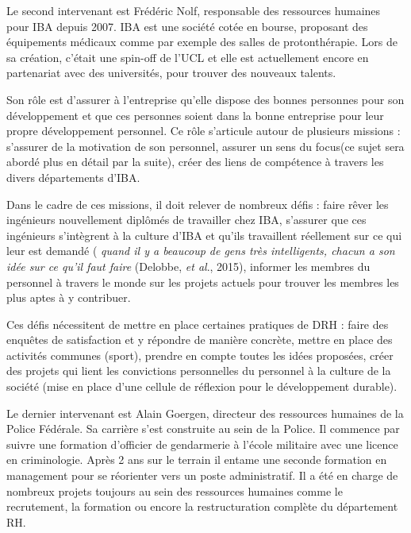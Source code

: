 Le second intervenant est Frédéric Nolf, responsable des ressources humaines pour IBA depuis 2007. IBA est une société cotée en bourse, proposant des équipements médicaux comme par exemple des salles de protonthérapie. Lors de sa création, c'était une spin-off de l'UCL et elle est actuellement encore en partenariat avec des universités, pour trouver des nouveaux talents. \newline

Son rôle est d'assurer à l'entreprise qu'elle dispose des bonnes personnes pour son développement et que ces personnes soient dans la bonne entreprise pour leur propre développement personnel. Ce rôle s'articule autour de plusieurs missions : s'assurer de la motivation de son personnel, assurer un \og{}sens du focus\fg{}(ce sujet sera abordé plus en détail par la suite), créer des liens de compétence à travers les divers départements d'IBA. \newline

Dans le cadre de ces missions, il doit relever de nombreux défis : faire rêver les ingénieurs nouvellement diplômés de travailler chez IBA, s'assurer que ces ingénieurs s'intègrent à la culture d'IBA et qu'ils travaillent réellement sur ce qui leur est demandé (\textit{\og{} quand il y a beaucoup de gens très intelligents, chacun a son idée sur ce qu'il faut faire \fg{}} (Delobbe, \textit{et al}., 2015), informer les membres du personnel à travers le monde sur les projets actuels pour trouver les membres les plus aptes à y contribuer. \newline

Ces défis nécessitent de mettre en place certaines pratiques de DRH : faire des enquêtes de satisfaction et y répondre de manière concrète, mettre en place des activités communes (sport), prendre en compte toutes les idées proposées, créer des projets qui lient les convictions personnelles du personnel à la culture de la société (mise en place d'une cellule de réflexion pour le développement durable). \newline

Le dernier intervenant est Alain Goergen, directeur des ressources humaines de la Police Fédérale. Sa carrière s'est construite au sein de la Police. Il commence par suivre une formation d'officier de gendarmerie à l'école militaire avec une licence en criminologie. Après 2 ans sur le terrain il entame une seconde formation en management pour se réorienter vers un poste administratif. Il a été en charge de nombreux projets toujours au sein des ressources humaines comme le recrutement, la formation ou encore la restructuration complète du département RH.\newline

